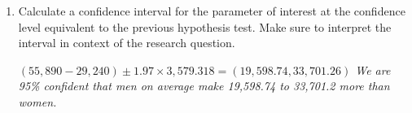 \documentclass[12pt]{article}
\newcommand{\soln}[2]{\textit{\textcolor{custom_red}{#2}}}{}
\begin{document}
\begin{enumerate}
\begin{enumerate}
\item Calculate a confidence interval for the parameter of interest at the confidence level equivalent to the 
previous hypothesis test. Make sure to interpret the interval in context of the research question.

\soln{5cm}{
$(55,890 - 29,240) \pm 1.97 \times 3,579.318 = (19,598.74, 33,701.26)$
We are 95\% confident that men on average make 19,598.74 to 33,701.2 more than women.
}

\end{enumerate}

\end{enumerate}

\end{document}

